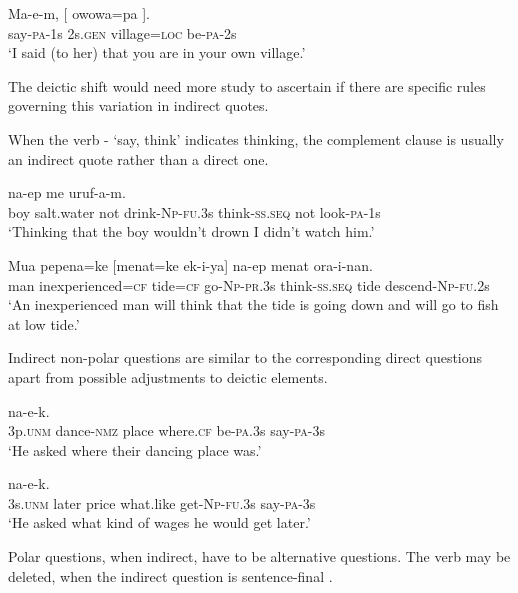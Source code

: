 \ea%
\label{ex:8:x1266}
\gll Ma-e-m,  [ \textstyleEmphasizedVernacularWords{} owowa=pa  ]. \\
say-\textsc{pa}-1s 2s.\textsc{gen} village=\textsc{loc} be-\textsc{pa}-2s\\
\glt`I said (to her) that you are in your own village.'
\z


The deictic shift would need more study to ascertain if there are specific rules governing this variation in indirect quotes.

When the verb - `say, think' indicates thinking, the complement clause is usually an indirect quote rather than a direct one. 

\ea%
\label{ex:8:x1588}
 na-ep  me  uruf-a-m.\\
boy  salt.water  not  drink-\textsc{Np}-\textsc{fu}.3s think-\textsc{ss}.\textsc{seq} not look-\textsc{pa}-1s\\
\glt`Thinking that the boy wouldn't drown I didn't watch him.'
\z


\ea%
\label{ex:8:x1589}
\gll Mua  pepena=ke  [menat=ke  ek-i-ya]  na-ep menat  ora-i-nan.\\
man  inexperienced=\textsc{cf} tide=\textsc{cf} go-\textsc{Np}-\textsc{pr}.3s think-\textsc{ss}.\textsc{seq} tide descend-\textsc{Np}-\textsc{fu}.2s\\
\glt`An inexperienced man will think that the tide is going down and will go to fish at low tide.'
\z


Indirect non-polar questions are similar to the corresponding direct questions apart from possible adjustments to deictic elements.

\ea%
\label{ex:8:x1592}
  na-e-k.\\
3p.\textsc{unm} dance-\textsc{nmz} place where.\textsc{cf} be-\textsc{pa}.3s say-\textsc{pa}-3s\\
\glt`He asked where their dancing place was.'
\z


\ea%
\label{ex:8:x1590}
  na-e-k.\\
3s.\textsc{unm} later  price  what.like  get-\textsc{Np}-\textsc{fu}.3s  say-\textsc{pa}-3s\\
\glt`He asked what kind of wages he would get later.'
\z


Polar questions, when indirect, have to be alternative questions. The verb  may be deleted, when the indirect question is sentence-final . 

